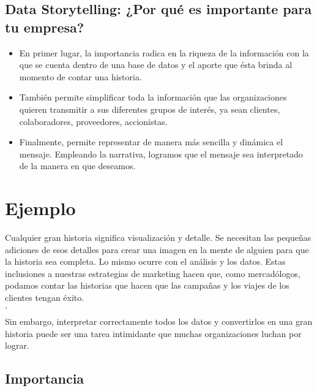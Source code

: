 \documentclass[preprint,12pt]{elsarticle}
\begin{document}
\subsection{Data Storytelling: ¿Por qué es importante para tu empresa?}	

\begin{itemize}



		\item En primer lugar, la importancia radica en la riqueza de la información con la que se cuenta dentro de una base de datos y el aporte que ésta brinda al momento de contar una historia.


		\item También permite simplificar toda la información que las organizaciones quieren transmitir a sus diferentes grupos de interés, ya sean clientes, colaboradores, proveedores, accionistas.



		\item Finalmente, permite representar de manera más sencilla y dinámica el mensaje. Empleando la narrativa, logramos que el mensaje sea interpretado de la manera en que deseamos.


\end{itemize}

	

\section{Ejemplo}
	\label{S:1}

Cualquier gran historia significa visualización y detalle. Se necesitan las pequeñas adiciones de esos detalles para crear una imagen en la mente de alguien para que la historia sea completa. Lo mismo ocurre con el análisis y los datos. Estas inclusiones a nuestras estrategias de marketing hacen que, como mercadólogos, podamos contar las historias que hacen que las campañas y los viajes de los clientes tengan éxito. \\
'\\
Sin embargo, interpretar correctamente todos los datos y convertirlos en una gran historia puede ser una tarea intimidante que muchas organizaciones luchan por lograr.\\

\subsection{Importancia}	
\end{document}
